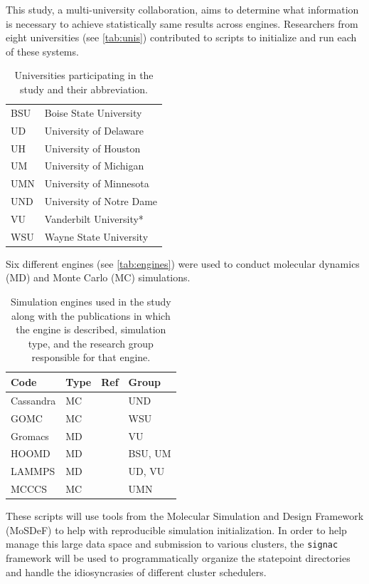 This study, a multi-university collaboration, aims to determine what information is necessary to achieve statistically same results across engines.
Researchers from eight universities (see \autoref{tab:unis}) contributed to scripts to initialize and run each of these systems.
\begin{table}[h!]
\caption{Universities participating in the study and their abbreviation.}\label{tab:unis}
\centering
\begin{tabular}{ll}
BSU & Boise State University \\
UD & University of Delaware \\
UH & University of Houston \\
UM & University of Michigan \\
UMN & University of Minnesota \\
UND & University of Notre Dame \\
VU & Vanderbilt University* \\
WSU & Wayne State University
\end{tabular}
\end{table}
Six different engines (see \autoref{tab:engines}) were used to conduct molecular dynamics (MD) and Monte Carlo (MC) simulations.
\begin{table}[h!]
\caption{Simulation engines used in the study along with the publications in which the engine is described, simulation type, and the research group responsible for that engine.}\label{tab:engines}
\centering
\begin{tabular}{llll}
Code      & Type & Ref             & Group   \\ \hline
Cassandra & MC   & \cite{Shah2017} & UND     \\
GOMC      & MC   & \cite{Shah2017} & WSU     \\
Gromacs   & MD   & \cite{ABRAHAM201519, Pall2015, 10.1093/bioinformatics/btt055, Lindahl2001, BERENDSEN199543, https://doi.org/10.1002/jcc.20291, Hess2008} & VU      \\
HOOMD     & MD   & \cite{Anderson2020, Nguyen2011a, Glaser2020a, Lebard2012} & BSU, UM \\
LAMMPS    & MD   & \cite{LAMMPS} & UD, VU  \\
MCCCS     & MC   & \cite{C8SC05340E,Josephson2019} & UMN    
\end{tabular}
\end{table}
These scripts will use tools from the Molecular Simulation and Design Framework (MoSDeF) to help with reproducible simulation initialization.
In order to help manage this large data space and submission to various clusters, the \texttt{signac} framework will be used to programmatically organize the statepoint directories and handle the idiosyncrasies of different cluster schedulers.
